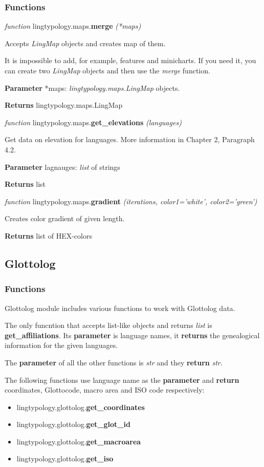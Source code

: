 \documentclass[a4paper,12pt]{article}
\begin{document}
\subsubsection{Functions}

\textit{function} lingtypology.maps.\textbf{merge} \textit{(*maps)}

Accepts \textit{LingMap} objects and creates map of them.

It is impossible to add, for example, features and minicharts. If you need it, you can create two \textit{LingMap} objects and then use the \textit{merge} function.

\textbf{Parameter} *maps: \textit{lingtypology.maps.LingMap} objects.

\textbf{Returns} lingtypology.maps.LingMap
\medskip

\textit{function} lingtypology.maps.\textbf{get\_elevations} \textit{(languages)}

Get data on elevation for languages. More information in Chapter 2, Paragraph 4.2.

\textbf{Parameter} lagnauges: \textit{list} of strings

\textbf{Returns} list
\medskip

\textit{function} lingtypology.maps.\textbf{gradient} \textit{(iterations, color1='white', color2='green')}

Creates color gradient of given length.

\textbf{Returns} list of HEX-colors

\subsection{Glottolog}

\subsubsection{Functions}
Glottolog module includes various functions to work with Glottolog data.

The only funcntion that accepts list-like objects and returns \textit{list} is \textbf{get\_affiliations}. Its \textbf{parameter} is language names, it \textbf{returns} the genealogical information for the given languages.

The \textbf{parameter} of all the other functions is \textit{str} and they \textbf{return} \textit{str}.

The following functions use language name as the \textbf{parameter} and \textbf{return} coordinates, Glottocode, macro area and ISO code respectively:
\begin{itemize}
 \item lingtypology.glottolog.\textbf{get\_coordinates}
 \item lingtypology.glottolog.\textbf{get\_glot\_id}
 \item lingtypology.glottolog.\textbf{get\_macroarea}
 \item lingtypology.glottolog.\textbf{get\_iso}
\end{itemize}
\end{document}
